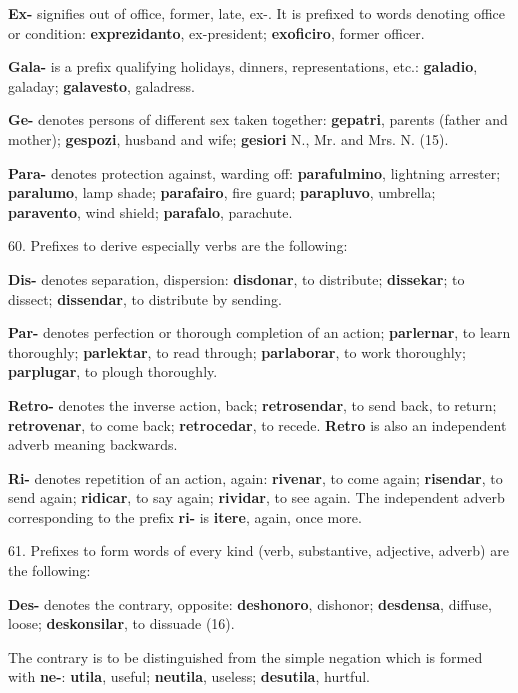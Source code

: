 \textbf{Ex-} signifies out of office, former, late, ex-. It is prefixed to words denoting office or condition: \textbf{exprezidanto}, ex-president; \textbf{exoficiro}, former officer. 

\textbf{Gala-} is a prefix qualifying holidays, dinners, representations, etc.: \textbf{galadio}, galaday; \textbf{galavesto}, galadress. 

\textbf{Ge-} denotes persons of different sex taken together: \textbf{gepatri}, parents (father and mother); \textbf{gespozi}, husband and wife; \textbf{gesiori} N., Mr. and Mrs. N. (15). 

\textbf{Para-} denotes protection against, warding off: \textbf{parafulmino}, lightning arrester; \textbf{paralumo}, lamp shade; \textbf{parafairo}, fire guard; \textbf{parapluvo}, umbrella; \textbf{paravento}, wind shield; \textbf{parafalo}, parachute. 

60. Prefixes to derive especially verbs are the following:

\textbf{Dis-} denotes separation, dispersion: \textbf{disdonar}, to distribute; \textbf{dissekar}; to dissect; \textbf{dissendar}, to distribute by sending. 

\textbf{Par-} denotes perfection or thorough completion of an action; \textbf{parlernar}, to learn thoroughly; \textbf{parlektar}, to read through; \textbf{parlaborar}, to work thoroughly; \textbf{parplugar}, to plough thoroughly. 

\textbf{Retro-} denotes the inverse action, back; \textbf{retrosendar}, to send back, to return; \textbf{retrovenar}, to come back; \textbf{retrocedar}, to recede. \textbf{Retro} is also an independent adverb meaning backwards. 

\textbf{Ri-} denotes repetition of an action, again: \textbf{rivenar}, to come again; \textbf{risendar}, to send again; \textbf{ridicar}, to say again; \textbf{rividar}, to see again. The independent adverb corresponding to the prefix \textbf{ri-} is \textbf{itere}, again, once more. 

61. Prefixes to form words of every kind (verb, substantive, adjective, adverb) are the following: 

\textbf{Des-} denotes the contrary, opposite: \textbf{deshonoro}, dishonor; \textbf{desdensa}, diffuse, loose; \textbf{deskonsilar}, to dissuade (16). 

The contrary is to be distinguished from the simple negation which is formed with \textbf{ne-}: \textbf{utila}, useful; \textbf{neutila}, useless; \textbf{desutila}, hurtful. 

